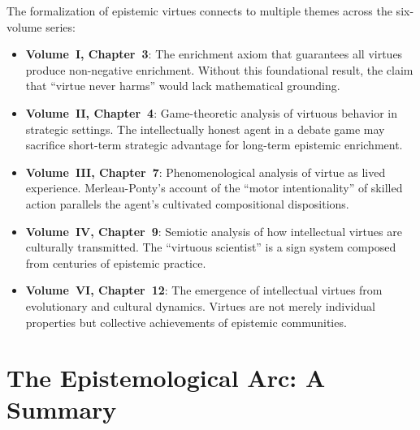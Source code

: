 \begin{remark}
The formalization of epistemic virtues connects to multiple themes across the
six-volume series:

\begin{itemize}
\item \textbf{Volume~I, Chapter~3}: The enrichment axiom that guarantees all virtues
  produce non-negative enrichment. Without this foundational result, the claim that
  ``virtue never harms'' would lack mathematical grounding.
\item \textbf{Volume~II, Chapter~4}: Game-theoretic analysis of virtuous behavior
  in strategic settings. The intellectually honest agent in a debate game may
  sacrifice short-term strategic advantage for long-term epistemic enrichment.
\item \textbf{Volume~III, Chapter~7}: Phenomenological analysis of virtue as lived
  experience. Merleau-Ponty's account of the ``motor intentionality'' of skilled
  action parallels the agent's cultivated compositional dispositions.
\item \textbf{Volume~IV, Chapter~9}: Semiotic analysis of how intellectual virtues
  are culturally transmitted. The ``virtuous scientist'' is a sign system composed
  from centuries of epistemic practice.
\item \textbf{Volume~VI, Chapter~12}: The emergence of intellectual virtues from
  evolutionary and cultural dynamics. Virtues are not merely individual properties
  but collective achievements of epistemic communities.
\end{itemize}
\end{remark}


\section{The Epistemological Arc: A Summary}

